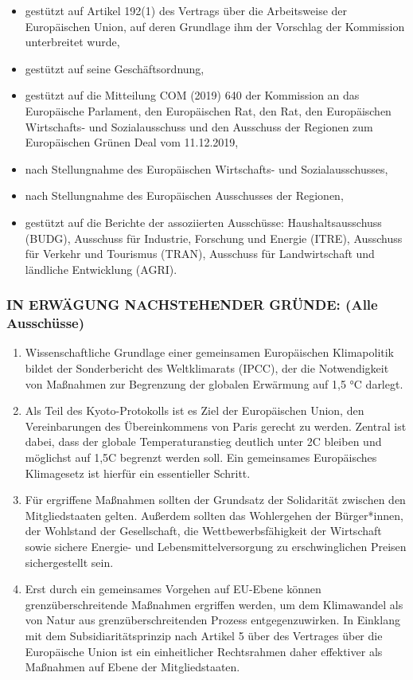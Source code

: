 \documentclass[12pt,a4paper]{article}
\begin{document}
\begin{itemize}[leftmargin=2em, itemsep=0.5pt]
  \item gestützt auf Artikel 192(1) des Vertrags über die Arbeitsweise der Europäischen Union, auf deren Grundlage ihm der Vorschlag der Kommission unterbreitet wurde,
  \item gestützt auf seine Geschäftsordnung,
  \item gestützt auf die Mitteilung COM (2019) 640 der Kommission an das Europäische Parlament, den Europäischen Rat, den Rat, den Europäischen Wirtschafts- und Sozialausschuss und den Ausschuss der Regionen zum Europäischen Grünen Deal vom 11.12.2019,
  \item nach Stellungnahme des Europäischen Wirtschafts- und Sozialausschusses,
  \item nach Stellungnahme des Europäischen Ausschusses der Regionen,
  \item gestützt auf die Berichte der assoziierten Ausschüsse: Haushaltsausschuss (BUDG), Ausschuss für Industrie, Forschung und Energie (ITRE), Ausschuss für Verkehr und Tourismus (TRAN), Ausschuss für Landwirtschaft und ländliche Entwicklung (AGRI).
\end{itemize}

\subsubsection*{IN ERWÄGUNG NACHSTEHENDER GRÜNDE: (Alle Ausschüsse)}

\begin{enumerate}[label=(\arabic*), leftmargin=2em, itemsep=0.5pt]
  \item Wissenschaftliche Grundlage einer gemeinsamen Europäischen Klimapolitik bildet der Sonderbericht des Weltklimarats (IPCC), der die Notwendigkeit von Maßnahmen zur Begrenzung der globalen Erwärmung auf 1,5 °C darlegt.
  \item Als Teil des Kyoto-Protokolls ist es Ziel der Europäischen Union, den Vereinbarungen des Übereinkommens von Paris gerecht zu werden. Zentral ist dabei, dass der globale Temperaturanstieg deutlich unter 2\textdegree C bleiben und möglichst auf 1,5\textdegree C begrenzt werden soll. Ein gemeinsames Europäisches Klimagesetz ist hierfür ein essentieller Schritt.
  \item Für ergriffene Maßnahmen sollten der Grundsatz der Solidarität zwischen den Mitgliedstaaten gelten. Außerdem sollten das Wohlergehen der Bürger*innen, der Wohlstand der Gesellschaft, die Wettbewerbsfähigkeit der Wirtschaft sowie sichere Energie- und Lebensmittelversorgung zu erschwinglichen Preisen sichergestellt sein.
  \item Erst durch ein gemeinsames Vorgehen auf EU-Ebene können grenzüberschreitende Maßnahmen ergriffen werden, um dem Klimawandel als von Natur aus grenzüberschreitenden Prozess entgegenzuwirken. In Einklang mit dem Subsidiaritätsprinzip nach Artikel 5 über des Vertrages über die Europäische Union ist ein einheitlicher Rechtsrahmen daher effektiver als Maßnahmen auf Ebene der Mitgliedstaaten.
\end{enumerate}
\end{document}
